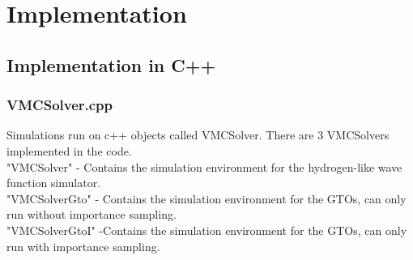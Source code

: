 \documentclass[twocolumn,fleqn,8pt]{article}  %
\begin{document}
\clearpage

\section{Implementation}
\subsection{Implementation in C++}
\subsubsection{VMCSolver.cpp}
Simulations run on c++ objects called VMCSolver. There are 3 VMCSolvers
implemented in the code.\\
"VMCSolver" - Contains the simulation environment for the hydrogen-like wave
function simulator.\\
"VMCSolverGto" - Contains the simulation environment for the GTOs, can only run
without importance sampling.\\
"VMCSolverGtoI" -Contains the simulation environment for the GTOs, can only run
with importance sampling.\\
\end{document}
